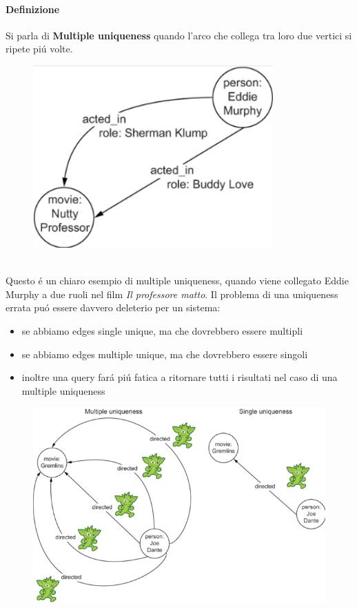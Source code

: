 \paragraph{Definizione} Si parla di \textbf{Multiple uniqueness} quando l'arco che collega tra loro due vertici si ripete piú volte. 
\\
\begin{figure}[th]
    \centering
    \includegraphics[width=0.35\linewidth]{GraphModeling//img/multipleuniq.png}
\end{figure}
\\
Questo é un chiaro esempio di multiple uniqueness, quando viene collegato Eddie Murphy a due ruoli nel film \textit{Il professore matto}. Il problema di una uniqueness errata puó essere davvero deleterio per un sistema:
\begin{itemize}
    \item se abbiamo edges single unique, ma che dovrebbero essere multipli
    \item se abbiamo edges multiple unique, ma che dovrebbero essere singoli
    \item inoltre una query fará piú fatica a ritornare tutti i risultati nel caso di una multiple uniqueness
\end{itemize}
\begin{figure}[th]
    \centering
    \includegraphics[width=0.75\linewidth]{GraphModeling//img/issues.png}
\end{figure}

\newpage
